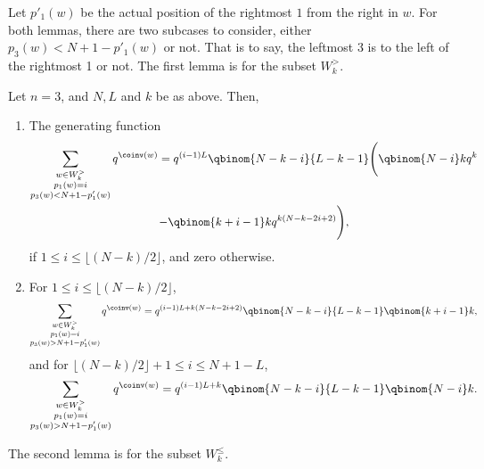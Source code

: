 Let $p'_1(w)$ be the actual position of the rightmost $1$ from the right in $w$.
For both lemmas, there are two subcases to consider, either $p_3(w) < N+1 - p'_1(w)$ or not.
That is to say, the leftmost 3 is to the left of the rightmost 1 or not. The first lemma is for the subset $W_k^>$.

\begin{lemma}
\label{lem:quinv>}
Let $n=3$, and $N, L$ and $k$ be as above. Then, 
\begin{enumerate}[label=(\arabic*)]
\item \label{it3vvt1}
The generating function
\begin{multline}
\label{quinv>l}
\sum_{\substack{ w \in W_k^> \\ p_1(w) = i \\ p_3(w) < N+1 - p'_1(w)}} q^{\coinv(w)} = q^{ (i-1) L} 
\qbinom{N-k-i}{L-k-1} \Bigg( \qbinom {N-i}k q^k \\
 - \qbinom{k+i-1}k q^{k(N-k-2i+2)} \Bigg),
\end{multline}
if $1 \leq i \leq \lfloor (N-k)/2 \rfloor$, and zero otherwise.

\item \label{it3vvt2}
For $1 \leq i \leq \lfloor (N-k)/2 \rfloor$,
\begin{equation}
\label{quinv>r1}
\sum_{\substack{ w \in W_k^> \\ p_1(w) = i \\ p_3(w) > N+1 - p'_1(w)}} q^{\coinv(w)} = q^{ (i-1) L + k(N-k-2i+2)} 
\qbinom{N-k-i}{L-k-1} \qbinom{k+i-1}k,
\end{equation}
and for $\lfloor (N-k)/2 \rfloor + 1 \leq i \leq N +1 - L$,
\begin{equation}
\label{quinv>r2}
\sum_{\substack{ w \in W_k^> \\ p_1(w) = i \\ p_3(w) > N+1 - p'_1(w)}} q^{\coinv(w)} = q^{ (i-1) L + k} 
\qbinom{N-k-i}{L-k-1} \qbinom {N-i}k.
\end{equation}
\end{enumerate}
\end{lemma}

The second lemma is for the subset $W_k^\leq$.

